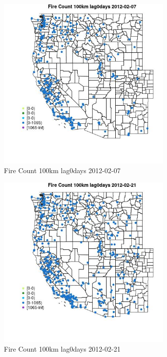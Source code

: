 \begin{figure} 
\centering  
\includegraphics[width=0.77\textwidth]{Code_Outputs/Report_ML_input_PM25_Step4_part_f_de_duplicated_aveswNAs_MapObsFire_Count_100km_lag0days2012-02-07.jpg} 
\caption{\label{fig:Report_ML_input_PM25_Step4_part_f_de_duplicated_aveswNAsMapObsFire_Count_100km_lag0days2012-02-07}Fire Count 100km lag0days 2012-02-07} 
\end{figure} 
 

\clearpage 

\begin{figure} 
\centering  
\includegraphics[width=0.77\textwidth]{Code_Outputs/Report_ML_input_PM25_Step4_part_f_de_duplicated_aveswNAs_MapObsFire_Count_100km_lag0days2012-02-21.jpg} 
\caption{\label{fig:Report_ML_input_PM25_Step4_part_f_de_duplicated_aveswNAsMapObsFire_Count_100km_lag0days2012-02-21}Fire Count 100km lag0days 2012-02-21} 
\end{figure} 
 

